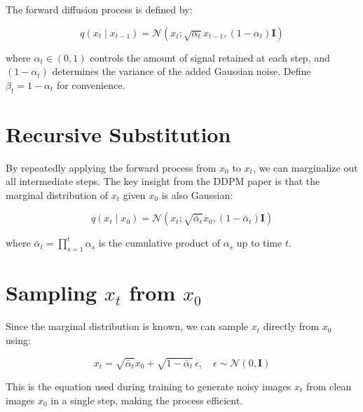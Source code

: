 \documentclass{article}
\author{}
\date{}
\begin{document}
The forward diffusion process is defined by:

\begin{equation}
q(x_t \mid x_{t-1}) = \mathcal{N}(x_t; \sqrt{\alpha_t} x_{t-1}, (1 - \alpha_t) \mathbf{I})
\end{equation}

where $\alpha_t \in (0, 1)$ controls the amount of signal retained at each step, and $(1 - \alpha_t)$ determines the variance of the added Gaussian noise. Define $\beta_t = 1 - \alpha_t$ for convenience.

\section*{Recursive Substitution}

By repeatedly applying the forward process from $x_0$ to $x_t$, we can marginalize out all intermediate steps. The key insight from the DDPM paper is that the marginal distribution of $x_t$ given $x_0$ is also Gaussian:

\begin{equation}
q(x_t \mid x_0) = \mathcal{N}(x_t; \sqrt{\bar{\alpha}_t} x_0, (1 - \bar{\alpha}_t) \mathbf{I})
\end{equation}

where $\bar{\alpha}_t = \prod_{s=1}^t \alpha_s$ is the cumulative product of $\alpha_s$ up to time $t$.

\section*{Sampling $x_t$ from $x_0$}

Since the marginal distribution is known, we can sample $x_t$ directly from $x_0$ using:

\begin{equation}
x_t = \sqrt{\bar{\alpha}_t} x_0 + \sqrt{1 - \bar{\alpha}_t} \, \epsilon, \quad \epsilon \sim \mathcal{N}(0, \mathbf{I})
\end{equation}

This is the equation used during training to generate noisy images $x_t$ from clean images $x_0$ in a single step, making the process efficient.
\end{document}
